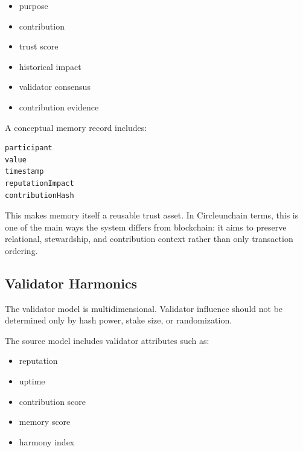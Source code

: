 ﻿\documentclass[12pt]{article}
\begin{document}
\begin{itemize}
  \item purpose
\end{itemize}
\begin{itemize}
  \item contribution
\end{itemize}
\begin{itemize}
  \item trust score
\end{itemize}
\begin{itemize}
  \item historical impact
\end{itemize}
\begin{itemize}
  \item validator consensus
\end{itemize}
\begin{itemize}
  \item contribution evidence
\end{itemize}

A conceptual memory record includes:

\begin{verbatim}
participant
value
timestamp
reputationImpact
contributionHash
\end{verbatim}

This makes memory itself a reusable trust asset. In Circleunchain terms, this is one of the main ways the system differs from blockchain: it aims to preserve relational, stewardship, and contribution context rather than only transaction ordering.

\subsection{Validator Harmonics}


The validator model is multidimensional. Validator influence should not be determined only by hash power, stake size, or randomization.

The source model includes validator attributes such as:

\begin{itemize}
  \item reputation
\end{itemize}
\begin{itemize}
  \item uptime
\end{itemize}
\begin{itemize}
  \item contribution score
\end{itemize}
\begin{itemize}
  \item memory score
\end{itemize}
\begin{itemize}
  \item harmony index
\end{itemize}
\end{document}
